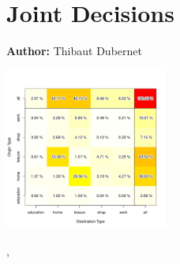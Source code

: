 \chapter{Joint Decisions}
\label{ch:jointtrips}

\hfill \textbf{Author:} Thibaut Dubernet

\begin{center} \includegraphics[width=0.4\textwidth, angle=0]{extending/figures/Jointtrips/passenger-per-type-ju3-asShareOfPassengerTrips} \end{center}



%
{\citet{DubernetAxhausen_TransLett_2013}, \citet{DubernetAxhausen_STRC_2014}}

